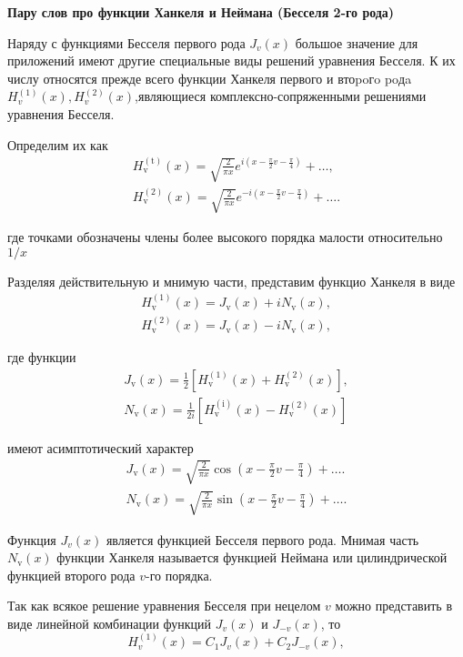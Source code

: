 \textbf{Пару слов про функции Ханкеля и Неймана (Бесселя 2-го рода)}

Наряду с функциями Бесселя первого рода $J_v(x)$ большое значение для приложений имеют другие специальные виды решений уравнения Бесселя. К их числу относятся прежде всего функции Ханкеля первого и втоpoгo poдa $H^{(1)}_v(x), H^{(2)}_v(x)$,являющиеся комплексно-сопряженными решениями уравнения Бесселя.

Определим их как
\[
\begin{aligned}
	H_{\mathrm{v}}^{(\mathrm{t})}(x)=\sqrt{\frac{2}{\pi x}} e^{i\left(x-\frac{\pi}{2} v-\frac{\pi}{4}\right)}+\ldots, \\
	H_{\mathrm{v}}^{(2)}(x)=\sqrt{\frac{2}{\pi x}} e^{-i\left(x-\frac{\pi}{2} v-\frac{\pi}{4}\right)}+\ldots .
\end{aligned}
\]

где точками обозначены члены более высокого порядка малости относительно $1 / x$

Разделяя действительную и мнимую части, представим функцио Ханкеля в виде
\[
\begin{aligned}
	H_{\mathrm{v}}^{(1)}(x)=J_{\mathrm{v}}(x)+i N_{\mathrm{v}}(x), \\
	H_{\mathrm{v}}^{(2)}(x)=J_{\mathrm{v}}(x)-i N_{\mathrm{v}}(x),
\end{aligned}
\]

где функции
\[
\begin{aligned}
	J_{\mathrm{v}}(x)=\frac{1}{2}\left[H_{\mathrm{v}}^{(1)}(x)+H_{\mathrm{v}}^{(2)}(x)\right], \\
	N_{\mathrm{v}}(x)=\frac{1}{2 i}\left[H_{\mathrm{v}}^{(\mathrm{i})}(x)-H_{\mathrm{v}}^{(2)}(x)\right]
\end{aligned}
\]

имеют асимптотический характер
\[
\begin{aligned}
	J_{\mathrm{v}}(x)=\sqrt{\frac{2}{\pi x}} \cos \left(x-\frac{\pi}{2} v-\frac{\pi}{4}\right)+\ldots . \\
	N_{\mathrm{v}}(x)=\sqrt{\frac{2}{\pi x}} \sin \left(x-\frac{\pi}{2} v-\frac{\pi}{4}\right)+\ldots .
\end{aligned}
\]

Функция $J_{v}(x)$ является функцией Бесселя первого рода. Мнимая часть $N_{\mathrm{v}}(x)$ функции Ханкеля называется функцией Неймана или цилиндрической функцией второго рода $v$-го порядка.

Так как всякое решение уравнения Бесселя при нецелом $v$ можно представить в виде линейной комбинации функций $J_{v}(x)$ и $J_{-v}(x)$, то
\[
H_{v}^{(1)}(x)=C_{1} J_{v}(x)+C_{2} J_{-v}(x),
\]

